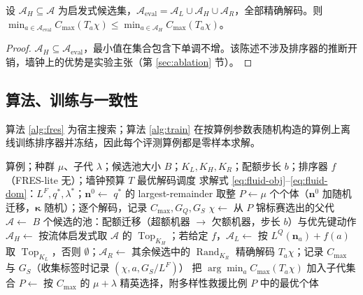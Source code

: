 \begin{proposition}[保底局部不劣]\label{prop:safeguard}
设 $\mathcal{A}_H \subseteq \mathcal{A}$ 为启发式候选集，$\mathcal{A}_{\mathrm{eval}} = \mathcal{A}_L \cup \mathcal{A}_H \cup \mathcal{A}_R$，全部精确解码。则 $\min_{a \in \mathcal{A}_{\mathrm{eval}}} C_{\max}(T_a\chi) \le \min_{a \in \mathcal{A}_H} C_{\max}(T_a\chi)$。
\end{proposition}
\begin{proof}
$\mathcal{A}_H \subseteq \mathcal{A}_{\mathrm{eval}}$，最小值在集合包含下单调不增。该陈述不涉及排序器的推断开销，墙钟上的优势是实验主张（第 \ref{sec:ablation} 节）。
\end{proof}

\subsection{算法、训练与一致性}\label{sec:algorithm}
算法 \ref{alg:fres} 为宿主搜索；算法 \ref{alg:train} 在按算例参数表随机构造的算例上离线训练排序器并冻结，因此每个评测算例都是零样本求解。

\begin{algorithm}[htbp]
\caption{FRES：流体-残差进化搜索}\label{alg:fres}
\begin{algorithmic}[1]
\Require 算例；种群 $\mu$、子代 $\lambda$；候选池大小 $B$；$K_L, K_H, K_R$；配额步长 $b$；排序器 $f$（FRES-lite 无）；墙钟预算 $T$
\Ensure 最优解码调度
\State 求解式 \eqref{eq:fluid-obj}--\eqref{eq:fluid-dom}：$L^F, q^*, \lambda^*$；$\mathbf{n}^0 \gets$ $q^*$ 的 largest-remainder 取整
\State $P \gets \mu$ 个个体（$\mathbf{n}^0$ 加随机迁移，$\boldsymbol{\kappa}$ 随机）；逐个解码，记录 $C_{\max}, G_Q, G_S$
    \State $\chi \gets$ 从 $P$ 锦标赛选出的父代
    \State $\mathcal{A} \gets$ $B$ 个候选的池：配额迁移（超额机器 $\to$ 欠额机器，步长 $b$）与优先键动作
    \State $\mathcal{A}_H \gets$ 按流体启发式取 $\mathcal{A}$ 的 $\operatorname{Top}_{K_H}$；若给定 $f$，$\mathcal{A}_L \gets$ 按 $L^Q(\mathbf{n}_a) + f(a)$ 取 $\operatorname{Top}_{K_L}$，否则 $\emptyset$；$\mathcal{A}_R \gets$ 其余候选中的 $\operatorname{Rand}_{K_R}$
      \State 精确解码 $T_a\chi$；记录 $C_{\max}$ 与 $G_S$（收集标签时记录 $(\chi, a, G_S/L^F)$）
    \EndFor
    \State 把 $\arg\min_a C_{\max}(T_a\chi)$ 加入子代集合
  \EndFor
  \State $P \gets$ 按 $C_{\max}$ 的 $\mu+\lambda$ 精英选择，附多样性救援比例
\EndWhile
\State \Return $P$ 中的最优个体
\end{algorithmic}
\end{algorithm}

